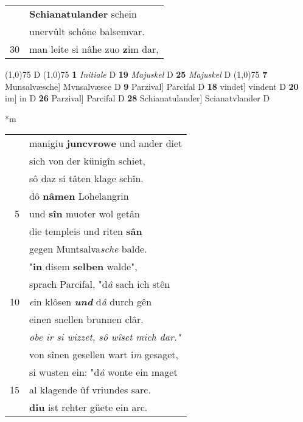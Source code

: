 \documentclass[8pt,a4paper,notitlepage]{article}
\begin{document}
\begin{table}[ht]
\begin{minipage}[t]{0.5\linewidth}
\begin{tabular}{rl}
 & \textbf{Schianatulander} schein\\ 
 & unervûlt schône balsemvar.\\ 
30 & man leite si nâhe zuo \textbf{z}im dar,\\ 
\end{tabular}
\scriptsize
\line(1,0){75} \newline
D \newline
\line(1,0){75} \newline
\textbf{1} \textit{Initiale} D  \textbf{19} \textit{Majuskel} D  \textbf{25} \textit{Majuskel} D  \newline
\line(1,0){75} \newline
\textbf{7} Munsalvæsche] Mvnsalvæsce D \textbf{9} Parzival] Parcifal D \textbf{18} vindet] vindent D \textbf{20} im] in D \textbf{26} Parzival] Parcifal D \textbf{28} Schianatulander] Scianatvlander D \newline
\end{minipage}
\hspace{0.5cm}
\begin{minipage}[t]{0.5\linewidth}
\small
\begin{center}*m
\end{center}
\begin{tabular}{rl}
 & manigiu \textbf{juncvrowe} und ander diet\\ 
 & sich von der künigîn schiet,\\ 
 & sô daz si tâten klage schîn.\\ 
 & dô \textbf{nâmen} Lohelangrin\\ 
5 & und \textbf{sîn} muoter wol getân\\ 
 & die templeis und riten \textbf{sân}\\ 
 & gegen Muntsalva\textit{sche} balde.\\ 
 & "\textbf{in} disem \textbf{selben} walde",\\ 
 & sprach Parcifal, "d\textit{â} sach ich stên\\ 
10 & \textit{e}in klôsen \textit{\textbf{und}} d\textit{â} durch gên\\ 
 & einen snellen brunnen clâr.\\ 
 & \textit{obe ir si wizzet, sô wîset mich dar."}\\ 
 & von sînen gesellen wart i\textit{m} gesaget,\\ 
 & si wusten ein: "d\textit{â} wonte ein maget\\ 
15 & al klagende ûf vriundes sarc.\\ 
 & \textbf{diu} ist rehter güete ein arc.\\ 

\end{tabular}
\end{minipage}
\end{table}
\end{document}
